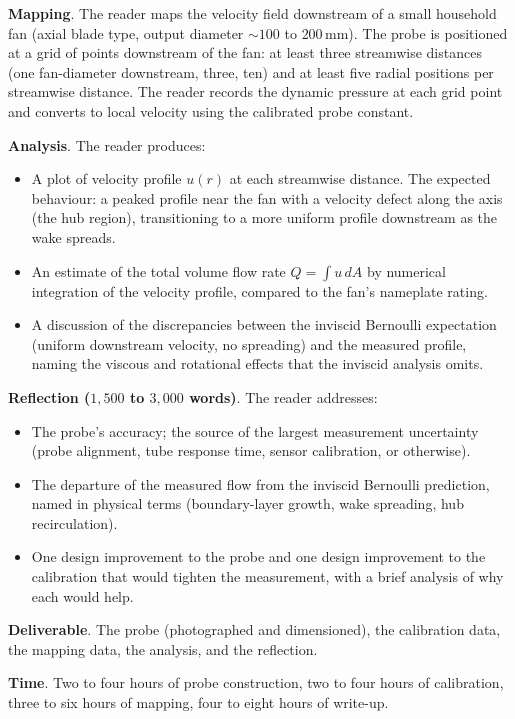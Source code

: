 \begin{project}
\textbf{Mapping}. The reader maps the velocity field downstream of
a small household fan (axial blade type, output diameter $\sim
100$ to $200\,\si{\milli\meter}$). The probe is positioned at a
grid of points downstream of the fan: at least three streamwise
distances (one fan-diameter downstream, three, ten) and at least
five radial positions per streamwise distance. The reader records
the dynamic pressure at each grid point and converts to local
velocity using the calibrated probe constant.

\textbf{Analysis}. The reader produces:

\begin{itemize}[leftmargin=*]
  \item A plot of velocity profile $u(r)$ at each streamwise
    distance. The expected behaviour: a peaked profile near the
    fan with a velocity defect along the axis (the hub region),
    transitioning to a more uniform profile downstream as the wake
    spreads.
  \item An estimate of the total volume flow rate $Q = \int u \,dA$
    by numerical integration of the velocity profile, compared to
    the fan's nameplate rating.
  \item A discussion of the discrepancies between the inviscid
    Bernoulli expectation (uniform downstream velocity, no
    spreading) and the measured profile, naming the viscous and
    rotational effects that the inviscid analysis omits.
\end{itemize}

\textbf{Reflection ($1{,}500$ to $3{,}000$ words)}. The reader
addresses:

\begin{itemize}[leftmargin=*]
  \item The probe's accuracy; the source of the largest
    measurement uncertainty (probe alignment, tube response time,
    sensor calibration, or otherwise).
  \item The departure of the measured flow from the inviscid
    Bernoulli prediction, named in physical terms (boundary-layer
    growth, wake spreading, hub recirculation).
  \item One design improvement to the probe and one design
    improvement to the calibration that would tighten the
    measurement, with a brief analysis of why each would help.
\end{itemize}

\textbf{Deliverable}. The probe (photographed and dimensioned),
the calibration data, the mapping data, the analysis, and the
reflection.

\textbf{Time}. Two to four hours of probe construction, two to
four hours of calibration, three to six hours of mapping, four to
eight hours of write-up.
\end{project}

